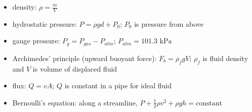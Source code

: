 \documentclass[11pt,letterpaper]{article}
\begin{document}
\begin{itemize}
\item density: $\rho=\frac{m}{V}$
\item hydrostatic pressure: $P=\rho{g}d+P_0$; $P_0$ is pressure from above
\item gauge pressure: $P_g=P_{gas}-P_{atm}$; $P_{atm}=101.3\mbox{ kPa}$
\item Archimedes' principle (upward buoyant force): $F_b=\rho_f{g}V$; $\rho_f$ is fluid density and $V$ is volume of displaced fluid
\item flux: $Q=vA$; $Q$ is constant in a pipe for ideal fluid
\item Bernoulli's equation: along a streamline, $P+\frac{1}{2}\rho{v^2}+\rho{g}h=\mathrm{constant}$
\end{itemize}
\end{document}
